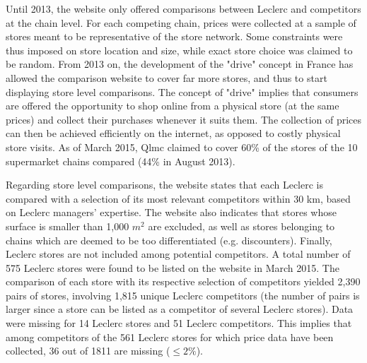 \documentclass[english]{article}
\begin{document}
Until 2013, the website only offered comparisons between Leclerc and competitors at the chain level. For each competing chain, prices were collected at a sample of stores meant to be representative of the store network. Some constraints were thus imposed on store location and size, while exact store choice was claimed to be random. From 2013 on, the development of the "drive" concept in France has allowed the comparison website to cover far more stores, and thus to start displaying store level comparisons. The concept of "drive" implies that consumers are offered the opportunity to shop online from a physical store (at the same prices) and collect their purchases whenever it suits them. The collection of prices can then be achieved efficiently on the internet, as opposed to costly physical store visits. As of March 2015, Qlmc claimed to cover 60\% of the stores of the 10 supermarket chains compared (44\% in August 2013).

Regarding store level comparisons, the website states that each Leclerc is compared with a selection of its most relevant competitors within 30 km, based on Leclerc managers' expertise. The website also indicates that stores whose surface is smaller than 1,000 $m^2$ are excluded, as well as stores belonging to chains which are deemed to be too differentiated (e.g. discounters). Finally, Leclerc stores are not included among potential competitors. A total number of 575 Leclerc stores were found to be listed on the website in March 2015. The comparison of each store with its respective selection of competitors yielded 2,390 pairs of stores, involving 1,815 unique Leclerc competitors (the number of pairs is larger since a store can be listed as a competitor of several Leclerc stores). Data were missing for 14 Leclerc stores and 51 Leclerc competitors. This implies that among competitors of the 561 Leclerc stores for which price data have been collected, 36 out of 1811 are missing ($\le 2 \%$).
\end{document}
